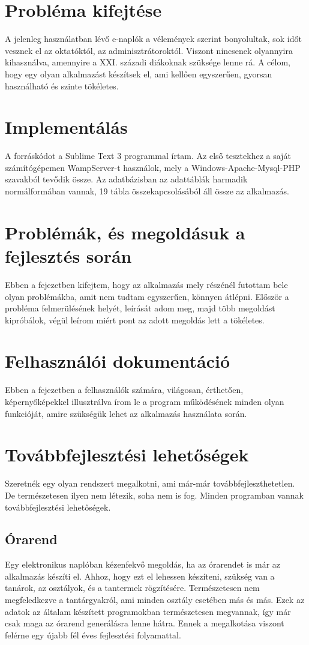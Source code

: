 \documentclass[
]{thesis-ekf}
\begin{document}
\chapter{Probléma kifejtése}
A jelenleg használatban lévő e-naplók a vélemények szerint bonyolultak, sok időt vesznek el az oktatóktól, az adminisztrátoroktól. Viszont nincsenek olyannyira kihasználva, amennyire a XXI. századi diákoknak szüksége lenne rá. A célom, hogy egy olyan alkalmazást készítsek el, ami kellően egyszerűen, gyorsan használható és szinte tökéletes.
\chapter{Implementálás}
A forráskódot a Sublime Text 3 programmal írtam. Az első tesztekhez a saját számítógépemen WampServer-t használok, mely a Windows-Apache-Mysql-PHP szavakból tevődik össze. Az adatbázisban az adattáblák harmadik normálformában vannak, 19 tábla összekapcsolásából áll össze az alkalmazás.
\chapter{Problémák, és megoldásuk a fejlesztés során}
Ebben a fejezetben kifejtem, hogy az alkalmazás mely részénél futottam bele olyan problémákba, amit nem tudtam egyszerűen, könnyen átlépni. Először a probléma felmerülésének helyét, leírását adom meg, majd több megoldást kipróbálok, végül leírom miért pont az adott megoldás lett a tökéletes.
\chapter{Felhasználói dokumentáció}
Ebben a fejezetben a felhasználók számára, világosan, érthetően, képernyőképekkel illusztrálva írom le a program működésének minden olyan funkcióját, amire szükségük lehet az alkalmazás használata során.
\chapter{Továbbfejlesztési lehetőségek}
Szeretnék egy olyan rendszert megalkotni, ami már-már továbbfejleszthetetlen. De természetesen ilyen nem létezik, soha nem is fog. Minden programban vannak továbbfejlesztési lehetőségek.
\section{Órarend}
Egy elektronikus naplóban kézenfekvő megoldás, ha az órarendet is már az alkalmazás készíti el. Ahhoz, hogy ezt el lehessen készíteni, szükség van a tanárok, az osztályok, és a tantermek rögzítésére. Természetesen nem megfeledkezve a tantárgyakról, ami minden osztály esetében más és más. Ezek az adatok az általam készített programokban természetesen megvannak, így már csak maga az órarend generálásra lenne hátra. Ennek a megalkotása viszont felérne egy újabb fél éves fejlesztési folyamattal.
\end{document}
